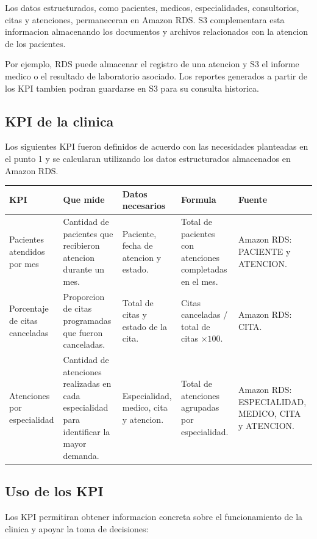 \documentclass[11pt,letterpaper]{article}
\begin{document}
Los datos estructurados, como pacientes, medicos, especialidades, consultorios, citas y
atenciones, permaneceran en Amazon RDS. S3 complementara esta informacion almacenando los
documentos y archivos relacionados con la atencion de los pacientes.

Por ejemplo, RDS puede almacenar el registro de una atencion y S3 el informe medico o el resultado
de laboratorio asociado. Los reportes generados a partir de los KPI tambien podran guardarse en
S3 para su consulta historica.

\subsection{KPI de la clinica}

Los siguientes KPI fueron definidos de acuerdo con las necesidades planteadas en el punto 1 y se
calcularan utilizando los datos estructurados almacenados en Amazon RDS.

\begin{center}
\scriptsize
\begin{tabularx}{\textwidth}{@{}p{2.5cm}Y Y Y p{2.4cm}@{}}
  \toprule
  \textbf{KPI} & \textbf{Que mide} & \textbf{Datos necesarios} & \textbf{Formula} & \textbf{Fuente} \\
  \midrule
  Pacientes atendidos por mes & Cantidad de pacientes que recibieron atencion durante un mes. & Paciente, fecha de atencion y estado. & Total de pacientes con atenciones completadas en el mes. & Amazon RDS: PACIENTE y ATENCION. \\
  Porcentaje de citas canceladas & Proporcion de citas programadas que fueron canceladas. & Total de citas y estado de la cita. & Citas canceladas / total de citas $\times 100$. & Amazon RDS: CITA. \\
  Atenciones por especialidad & Cantidad de atenciones realizadas en cada especialidad para identificar la mayor demanda. & Especialidad, medico, cita y atencion. & Total de atenciones agrupadas por especialidad. & Amazon RDS: ESPECIALIDAD, MEDICO, CITA y ATENCION. \\
  \bottomrule
\end{tabularx}
\end{center}

\subsection{Uso de los KPI}

Los KPI permitiran obtener informacion concreta sobre el funcionamiento de la clinica y apoyar la
toma de decisiones:
\end{document}
